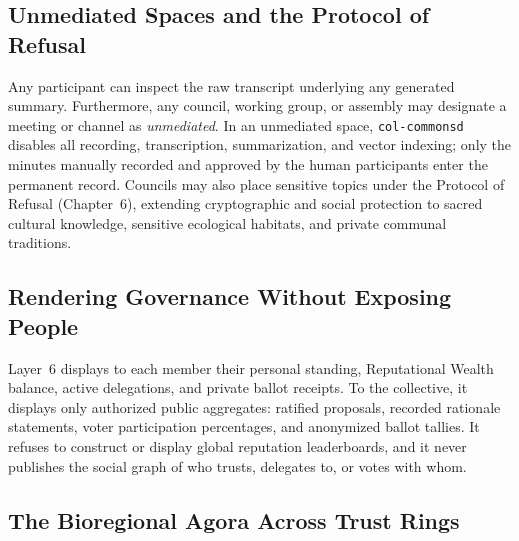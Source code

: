 \subsection{Unmediated Spaces and the Protocol of Refusal}

Any participant can inspect the raw transcript underlying any generated summary. Furthermore, any council, working group, or assembly may designate a meeting or channel as \textit{unmediated}. In an unmediated space, \texttt{col-commonsd} disables all recording, transcription, summarization, and vector indexing; only the minutes manually recorded and approved by the human participants enter the permanent record. Councils may also place sensitive topics under the Protocol of Refusal (Chapter~6), extending cryptographic and social protection to sacred cultural knowledge, sensitive ecological habitats, and private communal traditions.

\subsection{Rendering Governance Without Exposing People}

Layer~6 displays to each member their personal standing, Reputational Wealth balance, active delegations, and private ballot receipts. To the collective, it displays only authorized public aggregates: ratified proposals, recorded rationale statements, voter participation percentages, and anonymized ballot tallies. It refuses to construct or display global reputation leaderboards, and it never publishes the social graph of who trusts, delegates to, or votes with whom.

\subsection{The Bioregional Agora Across Trust Rings}

